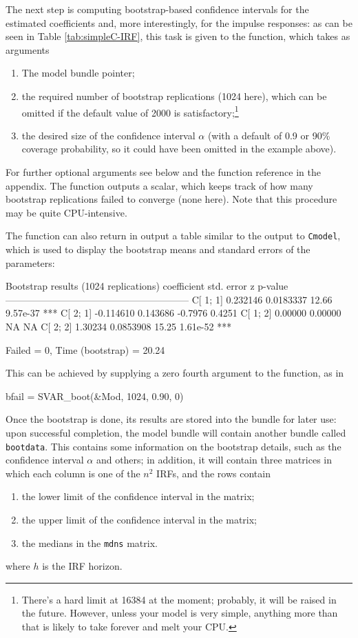 \documentclass[a4paper,10pt]{article}
\newcommand{\dtk}[1]{\texttt{\detokenize{#1}}}
\begin{document}
The next step is computing bootstrap-based confidence intervals for
the estimated coefficients and, more interestingly, for the impulse
responses: as can be seen in Table \ref{tab:simpleC-IRF}, this task is
given to the \dtk{SVAR_boot} function, which takes as arguments
\begin{enumerate}
\item The model bundle pointer;
\item the required number of bootstrap replications (1024
  here), which can be omitted if the default value of 2000 is 
    satisfactory;\footnote{There's a hard limit at 16384 at the moment;
    probably, it will be raised in the future. However, unless your
    model is very simple, anything more than that is likely to take
    forever and melt your CPU.}
\item the desired size of the confidence interval $\alpha$ (with a default 
  of 0.9 or 90\% coverage probability, so it could have been omitted in the 
  example above).
\end{enumerate}

For further optional arguments see below and the function reference in the 
appendix.
The function outputs a scalar, which keeps track of how many bootstrap
replications failed to converge (none here). Note that this procedure
may be quite CPU-intensive. 

The function can also return in output a table similar to the output
to \texttt{Cmodel}, which is used to display the bootstrap means and
standard errors of the parameters:
\begin{code}
Bootstrap results (1024 replications)
             coefficient   std. error      z       p-value 
  ---------------------------------------------------------
  C[ 1; 1]     0.232146    0.0183337    12.66      9.57e-37 ***
  C[ 2; 1]    -0.114610    0.143686     -0.7976    0.4251  
  C[ 1; 2]     0.00000     0.00000      NA        NA       
  C[ 2; 2]     1.30234     0.0853908    15.25      1.61e-52 ***

Failed = 0, Time (bootstrap) = 20.24
\end{code}
This can be achieved by supplying a zero fourth argument to the
\dtk{SVAR_boot} function, as in
\begin{code}
  bfail = SVAR_boot(&Mod, 1024, 0.90, 0)
\end{code}

Once the bootstrap is done, its results are stored into the bundle for
later use: upon successful completion, the model bundle will
contain another bundle called
\texttt{bootdata}. This contains some information on the bootstrap
details, such as the confidence interval $\alpha$ and others; in
addition, it will contain three matrices in which each column is one
of the $n^2$ IRFs, and the rows contain
\begin{enumerate}
\item the lower limit of the confidence interval in the
  \dtk{lo_cb} matrix;
\item the upper limit of the confidence interval in the
  \dtk{hi_cb} matrix;
\item the medians in the \texttt{mdns} matrix.
\end{enumerate}
where $h$ is the IRF horizon.
\end{document}
